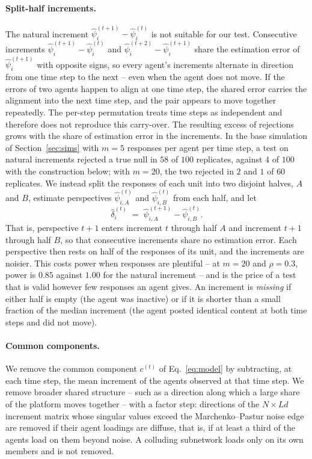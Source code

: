 \documentclass{article}
\theoremstyle{plain}
\theoremstyle{definition}
\begin{document}
\paragraph{Split-half increments.} The natural increment $\hat\psi_i^{(t+1)} - \hat\psi_i^{(t)}$ is not suitable for our test. Consecutive increments $\hat\psi_i^{(t+1)} - \hat\psi_i^{(t)}$ and $\hat\psi_i^{(t+2)} - \hat\psi_i^{(t+1)}$ share the estimation error of $\hat\psi_i^{(t+1)}$ with opposite signs, so every agent's increments alternate in direction from one time step to the next -- even when the agent does not move. If the errors of two agents happen to align at one time step, the shared error carries the alignment into the next time step, and the pair appears to move together repeatedly. The per-step permutation treats time steps as independent and therefore does not reproduce this carry-over. The resulting excess of rejections grows with the share of estimation error in the increments. In the base simulation of Section~\ref{sec:sims} with $m=5$ responses per agent per time step, a test on natural increments rejected a true null in $58$ of $100$ replicates, against $4$ of $100$ with the construction below; with $m=20$, the two rejected in $2$ and $1$ of $60$ replicates. We instead split the responses of each unit into two disjoint halves, $A$ and $B$, estimate perspectives $\hat\psi_{i,A}^{(t)}$ and $\hat\psi_{i,B}^{(t)}$ from each half, and let
\begin{equation}
\label{eq:increment}
\hat\delta_i^{(t)} \;=\; \hat\psi_{i,A}^{(t+1)} - \hat\psi_{i,B}^{(t)}.
\end{equation}
That is, perspective $t+1$ enters increment $t$ through half $A$ and increment $t+1$ through half $B$, so that consecutive increments share no estimation error. Each perspective then rests on half of the responses of its unit, and the increments are noisier. This costs power when responses are plentiful -- at $m=20$ and $\rho=0.3$, power is $0.85$ against $1.00$ for the natural increment -- and is the price of a test that is valid however few responses an agent gives. An increment is \emph{missing} if either half is empty (the agent was inactive) or if it is shorter than a small fraction of the median increment (the agent posted identical content at both time steps and did not move).

\paragraph{Common components.} We remove the common component $c^{(t)}$ of Eq.~\eqref{eq:model} by subtracting, at each time step, the mean increment of the agents observed at that time step. We remove broader shared structure -- such as a direction along which a large share of the platform moves together -- with a factor step: directions of the $N\times Ld$ increment matrix whose singular values exceed the Marchenko--Pastur noise edge are removed if their agent loadings are diffuse, that is, if at least a third of the agents load on them beyond noise. A colluding subnetwork loads only on its own members and is not removed.
\end{document}
